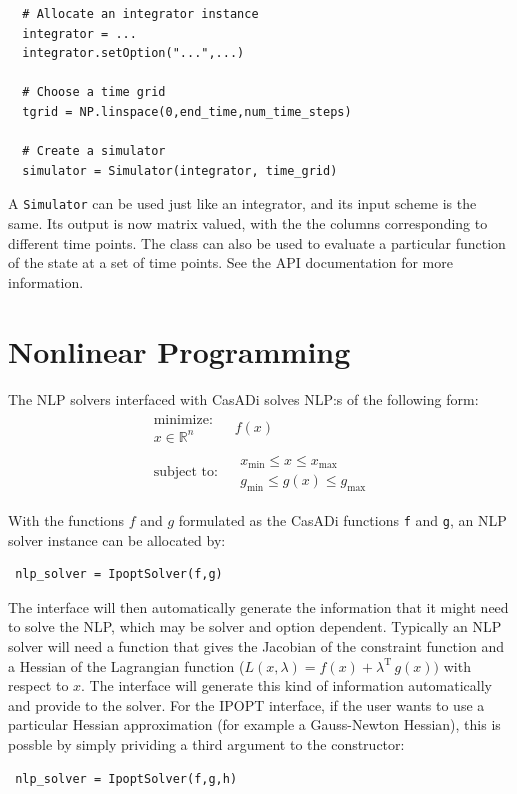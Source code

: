 \documentclass[a4paper,12pt]{book}
\begin{document}
{\begin{verbatim}
  # Allocate an integrator instance
  integrator = ...
  integrator.setOption("...",...)

  # Choose a time grid
  tgrid = NP.linspace(0,end_time,num_time_steps)

  # Create a simulator
  simulator = Simulator(integrator, time_grid)
\end{verbatim}

A \texttt{Simulator} can be used just like an integrator, and its input scheme is the same. Its output is now matrix valued, with the the columns corresponding to different time points. The class can also be used to evaluate a particular function of the state at a set of time points. See the API documentation for more information.

\chapter{Nonlinear Programming}
The NLP solvers interfaced with CasADi solves NLP:s of the following form:
\begin{equation}
\begin{array}{cc}
\begin{array}{c}
\text{minimize:} \\
x \in \mathbb{R}^n
\end{array}
&
f(x)
\\
\begin{array}{c}
\text{subject to:}
\end{array}
&
\begin{array}{c}
x_{\min} \le x \le x_{\max} \\
g_{\min} \le g(x) \le g_{\max}
\end{array}
\end{array}
\end{equation}

With the functions $f$ and $g$ formulated as the CasADi functions \texttt{f} and \texttt{g}, an NLP solver instance can be allocated by:
\begin{verbatim}
 nlp_solver = IpoptSolver(f,g)
\end{verbatim}

The interface will then automatically generate the information that it might need to solve the NLP, which may be solver and option dependent. Typically an NLP solver will need a function that gives the Jacobian of the constraint function and a Hessian of the Lagrangian function ($L(x,\lambda) = f(x) + \lambda^{\text{T}} \, g(x))$ with respect to $x$. The interface will generate this kind of information automatically and provide to the solver. For the IPOPT interface, if the user wants to use a particular Hessian approximation (for example a Gauss-Newton Hessian), this is possble by simply prividing a third argument to the constructor:
\begin{verbatim}
 nlp_solver = IpoptSolver(f,g,h)
\end{verbatim}

}
\end{document}
